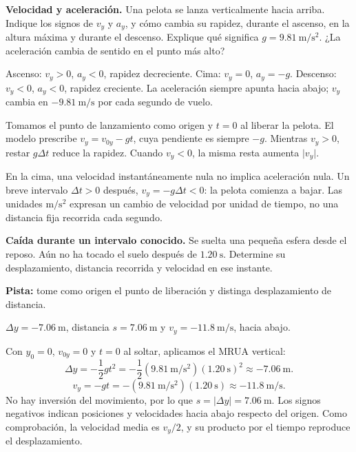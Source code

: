 \begin{ejercicio}
\textbf{Velocidad y aceleración.} Una pelota se lanza verticalmente hacia arriba. Indique los signos de \(v_y\) y \(a_y\), y cómo cambia su rapidez, durante el ascenso, en la altura máxima y durante el descenso. Explique qué significa \(g=\SI{9.81}{\meter\per\second\squared}\). ¿La aceleración cambia de sentido en el punto más alto?
\end{ejercicio}
\begin{respuesta}
Ascenso: \(v_y>0\), \(a_y<0\), rapidez decreciente. Cima: \(v_y=0\), \(a_y=-g\). Descenso: \(v_y<0\), \(a_y<0\), rapidez creciente. La aceleración siempre apunta hacia abajo; \(v_y\) cambia en \(-\SI{9.81}{\meter\per\second}\) por cada segundo de vuelo.
\end{respuesta}
\begin{explicacion}
Tomamos el punto de lanzamiento como origen y \(t=0\) al liberar la pelota. El modelo prescribe \(v_y=v_{0y}-gt\), cuya pendiente es siempre \(-g\). Mientras \(v_y>0\), restar \(g\Delta t\) reduce la rapidez. Cuando \(v_y<0\), la misma resta aumenta \(\lvert v_y\rvert\).

En la cima, una velocidad instantáneamente nula no implica aceleración nula. Un breve intervalo \(\Delta t>0\) después, \(v_y=-g\Delta t<0\): la pelota comienza a bajar. Las unidades \(\si{\meter\per\second\squared}\) expresan un cambio de velocidad por unidad de tiempo, no una distancia fija recorrida cada segundo.
\end{explicacion}

\begin{ejercicio}
\textbf{Caída durante un intervalo conocido.} Se suelta una pequeña esfera desde el reposo. Aún no ha tocado el suelo después de \(\SI{1.20}{\second}\). Determine su desplazamiento, distancia recorrida y velocidad en ese instante.

\textbf{Pista:} tome como origen el punto de liberación y distinga desplazamiento de distancia.
\end{ejercicio}
\begin{respuesta}
\(\Delta y=-\SI{7.06}{\meter}\), distancia \(s=\SI{7.06}{\meter}\) y \(v_y=-\SI{11.8}{\meter\per\second}\), hacia abajo.
\end{respuesta}
\begin{explicacion}
Con \(y_0=0\), \(v_{0y}=0\) y \(t=0\) al soltar, aplicamos el MRUA vertical:
\[ \Delta y=-\frac12gt^2=-\frac12(\SI{9.81}{\meter\per\second\squared})(\SI{1.20}{\second})^2\approx-\SI{7.06}{\meter}. \]
\[ v_y=-gt=-(\SI{9.81}{\meter\per\second\squared})(\SI{1.20}{\second})\approx-\SI{11.8}{\meter\per\second}. \]
No hay inversión del movimiento, por lo que \(s=\lvert\Delta y\rvert=\SI{7.06}{\meter}\). Los signos negativos indican posiciones y velocidades hacia abajo respecto del origen. Como comprobación, la velocidad media es \(v_y/2\), y su producto por el tiempo reproduce el desplazamiento.
\end{explicacion}

